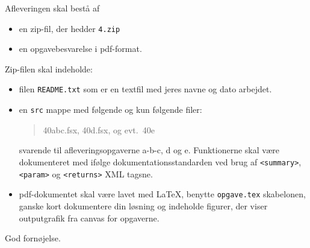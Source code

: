 \documentclass[a4paper,12pt]{article}
\newcommand{\exerciseNumber}{4}
\begin{document}
Afleveringen skal bestå af
\begin{itemize}
  \item en zip-fil, der hedder \texttt{\exerciseNumber\typeLetter.zip}
  \item en opgavebesvarelse i pdf-format.
\end{itemize}
Zip-filen skal indeholde:
\begin{itemize}
\item filen \texttt{README.txt} som er en textfil med jeres navne og dato arbejdet.
\item en \texttt{src} mappe med følgende og kun
  følgende filer:
  \begin{quote}
    \exerciseNumber\typeLetter0abc.fsx, \exerciseNumber\typeLetter0d.fsx, og evt.\ \exerciseNumber\typeLetter0e
  \end{quote}
  svarende til afleveringsopgaverne a-b-c, d og e. Funktionerne skal være dokumenteret med ifølge dokumentationsstandarden ved brug af \verb|<summary>|, \verb|<param>| og \verb|<returns>| XML tagsne.
  \item pdf-dokumentet skal være lavet med \LaTeX, benytte \lstinline[language=console]{opgave.tex} skabelonen, ganske kort dokumentere din løsning og indeholde figurer, der viser outputgrafik fra canvas for opgaverne.
\end{itemize}

\flushright God fornøjelse.
\end{document}

